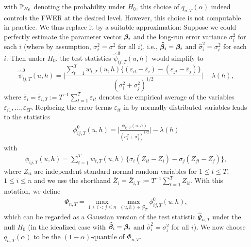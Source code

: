 \documentclass[12pt]{article}
\makeatletter
\renewcommand{\eqref}[1]{\tagform@{\ref{#1}}}
\makeatother
\begin{document}
with $\mathbb{P}_{H_0}$ denoting the probability under $H_0$, this choice of $q_{n,T}(\alpha)$ indeed controls the FWER at the desired level. However, this choice is not computable in practice. We thus replace it by a suitable approximation: Suppose we could perfectly estimate the parameter vector $\bm{\beta}_i$ and the long-run error variance $\sigma_i^2$ for each $i$ (where by assumption, $\sigma_i^2 = \sigma^2$ for all $i$), i.e., $\widehat{\bm{\beta}}_i = \bm{\beta}_i$ and $\widehat{\sigma}_i^2 = \sigma_i^2$ for each $i$. Then under $H_0$, the test statistics $\widehat{\psi}^0_{ij, T}(u, h)$ would simplify to 
\begin{equation}\label{eq:stat-idealized}
\widehat{\psi}^0_{ij, T}(u, h) = \Big| \frac{\sum\nolimits_{t=1}^T w_{t,T}(u, h) \{ (\varepsilon_{it} - \bar{\varepsilon}_i) - (\varepsilon_{jt} - \bar{\varepsilon}_j) \}}{(\sigma_i^2 + \sigma_j^2)^{1/2}} \Big| - \lambda(h), 
\end{equation}
where $\bar{\varepsilon}_i = \bar{\varepsilon}_{i,T} := T^{-1} \sum_{t=1}^T \varepsilon_{it}$ denotes the empirical average of the variables $\varepsilon_{i1},\ldots,\varepsilon_{iT}$. Replacing the error terms $\varepsilon_{it}$ in \eqref{eq:stat-idealized} by normally distributed variables leads to the statistics
\begin{align}\label{eq:phi_zero_ij}
\phi^0_{ij, T}(u, h) =  \bigg|\frac{\phi_{ij, T}(u, h)}{(\sigma_i^2 + \sigma_j^2)^{1/2}}\bigg| - \lambda(h)
\end{align}
with 
\begin{align}\label{eq:phi_ij}
\phi_{ij, T}(u, h) = \sum\limits_{t=1}^T w_{t,T}(u, h) \, \big\{ \sigma_i (Z_{it} - \bar{Z}_i) - \sigma_j (Z_{jt} - \bar{Z}_j) \big\},
\end{align}
where $Z_{it}$ are independent standard normal random variables for $1 \le t \le T$, $1 \le i \le n$ and we use the shorthand $\bar{Z}_i = \bar{Z}_{i,T} := T^{-1} \sum_{t=1}^T Z_{it}$. With this notation, we define 
\begin{align}\label{eq:Phi}
\Phi_{n,T} = \max_{1 \le i < j \le n}\max_{(u, h) \in \mathcal{G}_T} \phi^0_{ij, T}(u, h),
\end{align}
which can be regarded as a Gaussian version of the test statistic $\widehat{\Psi}_{n,T}$ under the null $H_0$ (in the idealized case with $\widehat{\bm{\beta}}_i = \bm{\beta}_i$ and $\widehat{\sigma}_i^2 = \sigma_i^2$ for all $i$). We now choose $q_{n,T}(\alpha)$ to be the $(1-\alpha)$-quantile of $\Phi_{n,T}$. 
\end{document}
